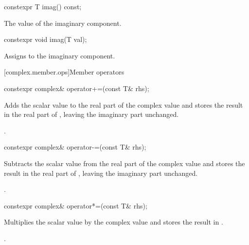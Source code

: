 %
\begin{itemdecl}
constexpr T imag() const;
\end{itemdecl}

\begin{itemdescr}
\pnum
\returns
The value of the imaginary component.
\end{itemdescr}

%
\begin{itemdecl}
constexpr void imag(T val);
\end{itemdecl}

\begin{itemdescr}
\pnum
\effects
Assigns  to the imaginary component.
\end{itemdescr}

[complex.member.ops]{Member operators}

%
\begin{itemdecl}
constexpr complex& operator+=(const T& rhs);
\end{itemdecl}

\begin{itemdescr}
\pnum
\effects
Adds the scalar value  to the real part of the complex value
and stores the result in the real part of
,
leaving the imaginary part unchanged.

\pnum
\returns
{}.
\end{itemdescr}

%
\begin{itemdecl}
constexpr complex& operator-=(const T& rhs);
\end{itemdecl}

\begin{itemdescr}
\pnum
\effects
Subtracts the scalar value  from the real part of the complex value
and stores the result in the real part of
,
leaving the imaginary part unchanged.

\pnum
\returns
{}.
\end{itemdescr}

%
\begin{itemdecl}
constexpr complex& operator*=(const T& rhs);
\end{itemdecl}

\begin{itemdescr}
\pnum
\effects
Multiplies the scalar value  by the complex value
and stores the result in
.

\pnum
\returns
{}.
\end{itemdescr}

